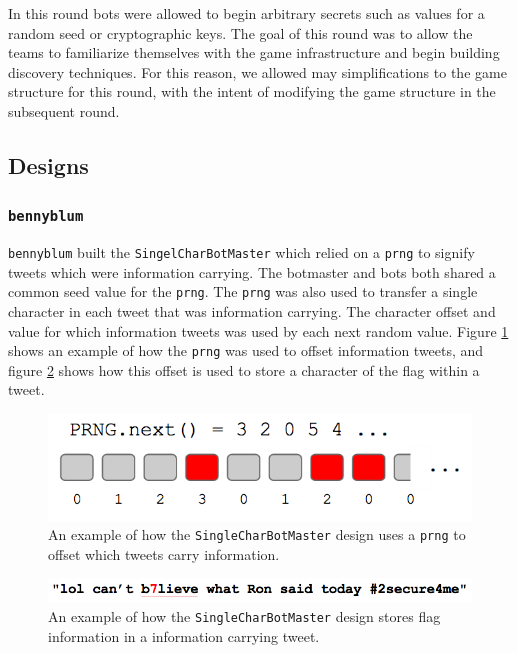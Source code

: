 \documentclass[11pt, oneside]{article} %
\numberwithin{equation}{section} %
\numberwithin{figure}{section} %
\numberwithin{table}{section} %
\renewcommand{\c}[1]{\texttt{#1}}
\newcommand{\teambb}{\c{bennyblum}}
\begin{document}
		In this round bots were allowed to begin arbitrary secrets such as values for a random seed or cryptographic keys. The goal of this round was to allow the teams to familiarize themselves with the game infrastructure and begin building discovery techniques. For this reason, we allowed may simplifications to the game structure for this round, with the intent of modifying the game structure in the subsequent round. 

	\subsection{Designs}
		\subsubsection{\teambb{}}
			\teambb{} built the \c{SingelCharBotMaster} which relied on a \c{prng} to signify tweets which were information carrying. The botmaster and bots both shared a common seed value for the \c{prng}. The \c{prng} was also used to transfer a single character in each tweet that was information carrying. The character offset and value for which information tweets was used by each next random value. Figure \ref{fig:prng} shows an example of how the \c{prng} was used to offset information tweets, and figure \ref{fig:prng-tweet-ex} shows how this offset is used to store a character of the flag within a tweet. \\

		\begin{figure}[H]
		    \center\includegraphics[scale=0.70]{resources/prng.png}
		    \caption{An example of how the \c{SingleCharBotMaster} design uses a \c{prng} to offset which tweets carry information.}
		    \label{fig:prng}
		 \end{figure}

		 \begin{figure}[H]
		    \center\includegraphics[scale=0.60]{resources/prng-tweet-ex.png}
		    \caption{An example of how the \c{SingleCharBotMaster} design stores flag information in a information carrying tweet.}
		    \label{fig:prng-tweet-ex}
		 \end{figure}
		
\end{document}
